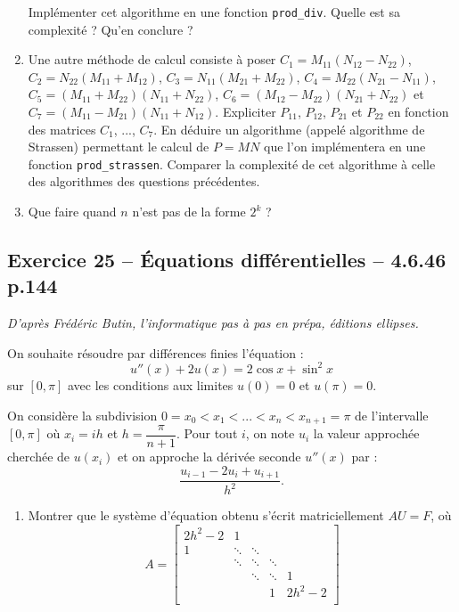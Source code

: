 \documentclass[10pt,fleqn]{article} %
\begin{document}
\begin{multicols}{2}
\begin{enumerate}
Implémenter cet algorithme en une fonction \texttt{prod\_div}. Quelle est sa complexité ? Qu'en conclure ?
\item Une autre méthode de calcul consiste à poser 
$C_1 =M_{11}\left(N_{12} - N_{22} \right)$, 
$C_2 =N_{22}\left(M_{11} + M_{12} \right)$, 
$C_3 =N_{11}\left(M_{21} + M_{22}\right)$, 
$C_4 =M_{22}\left(N_{21} - N_{11} \right)$, 
$C_5 =\left(M_{11} + M_{22} \right) \left(N_{11} + N_{22} \right)$, 
$C_6 =\left(M_{12} - M_{22} \right)\left(N_{21} + N_{22} \right)$
et
$C_7 =\left(M_{11} - M_{21} \right)\left(N_{11} + N_{12} \right)$. Expliciter $P_{11}$, $P_{12}$, $P_{21}$ et $P_{22}$ en fonction des matrices $C_1$, ..., $C_7$. En déduire un algorithme (appelé algorithme de Strassen) permettant le calcul de $P=MN$ que l'on implémentera en une fonction \texttt{prod\_strassen}. Comparer la complexité de cet algorithme à celle des algorithmes des questions précédentes. 
\item Que faire quand $n$ n'est pas de la forme $2^k$ ?
\end{enumerate}


\subsection*{Exercice 25 -- Équations différentielles -- 4.6.46 p.144}
\begin{flushright}
\textit{D'après Frédéric Butin, l'informatique pas à pas en prépa, éditions ellipses.}
\end{flushright}
On souhaite résoudre par différences finies l'équation :
$$
u''(x)+2u(x) = 2 \cos x + \sin^2 x
$$
sur $[0,\pi]$ avec les conditions aux limites $u(0)=0$ et $u(\pi)=0$.

On considère la subdivision $0=x_0<x_1<...<x_n<x_{n+1} = \pi$ de l'intervalle $[0,\pi]$ où $x_i=ih$ et $h=\dfrac{\pi}{n+1}$. Pour tout $i$, on note $u_i$ la valeur approchée cherchée de $u(x_i)$ et on approche la dérivée seconde $u''(x)$ par :
$$
\dfrac{u_{i-1}-2u_i+u_{i+1}}{h^2}.
$$

\begin{enumerate}
\item Montrer que le système d'équation obtenu s'écrit matriciellement $AU=F$, où 
$$
A= 
\begin{bmatrix}
2h^2 - 2 & 1        & & & \\
1           & \ddots & \ddots & &  \\
& \ddots & \ddots &\ddots  & \\
& & \ddots & \ddots &1\\  
&& & 1 & 2h^2-2 \\
\end{bmatrix}
$$


\end{enumerate}
\end{multicols}
\end{document}
